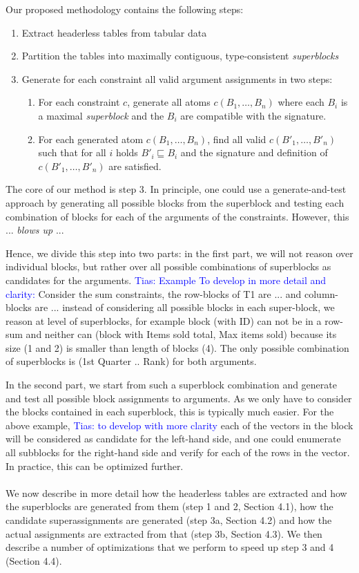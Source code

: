 \documentclass{IEEEtran}
\newcommand{\tias}[1]{\textcolor{blue}{{\sc Tias:} #1}\xspace}
\theoremstyle{definition}
\begin{document}
Our proposed methodology contains the following steps:
\begin{enumerate}
\item Extract headerless tables from tabular data
\item Partition the tables into maximally contiguous, type-consistent \textit{superblocks}
\item Generate for each constraint all valid argument assignments in two steps:
\begin{enumerate}
\item For each constraint $c$, generate all atoms $c(B_1, \ldots ,B_n)$ where each $B_i$ is a maximal \textit{superblock} and the $B_i$ are compatible with the signature.
\item For each generated atom $c(B_1, \ldots ,B_n)$, find all valid $c(B'_1, \ldots, B'_n)$ such that for all $i$ holds $B'_i \sqsubseteq B_i$ and the signature and definition of $c(B'_1, \ldots, B'_n)$ are satisfied.
\end{enumerate}
\end{enumerate}

The core of our method is step 3. In principle, one could use a generate-and-test approach by generating all possible blocks from the superblock and testing each combination of blocks for each of the arguments of the constraints. However, this ... \textit{blows up} ...

Hence, we divide this step into two parts: in the first part, we will not reason over individual blocks, but rather over all possible combinations of superblocks as candidates for the arguments.
\tias{Example To develop in more detail and clarity:}
Consider the sum constraints, the row-blocks of T1 are ... and column-blocks are ... instead of considering all possible blocks in each super-block, we reason at level of superblocks, for example block (with ID) can not be in a row-sum and neither can (block with Items sold total, Max items sold) because its size (1 and 2) is smaller than length of blocks (4). The only possible combination of superblocks is (1st Quarter .. Rank) for both arguments.

In the second part, we start from such a superblock combination and generate and test all possible block assignments to arguments. As we only have to consider the blocks contained in each superblock, this is typically much easier. For the above example, \tias{to develop with more clarity} each of the vectors in the block will be considered as candidate for the left-hand side, and one could enumerate all subblocks for the right-hand side and verify for each of the rows in the vector. In practice, this can be optimized further.
\\\\
We now describe in more detail how the headerless tables are extracted and how the superblocks are generated from them (step 1 and 2, Section 4.1), how the candidate superassignments are generated (step 3a, Section 4.2) and how the actual assignments are extracted from that (step 3b, Section 4.3). We then describe a number of optimizations that we perform to speed up step 3 and 4 (Section 4.4).
\end{document}
